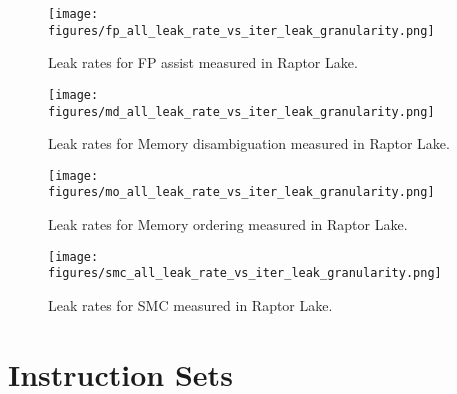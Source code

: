 \begin{figure}[h]
    \centering
    \texttt{[image: figures/fp\_all\_leak\_rate\_vs\_iter\_leak\_granularity.png]}
    \caption{Leak rates for FP assist measured in Raptor Lake.}
    \label{fig:11}
\end{figure}


\begin{figure}[h]
    \centering
    \texttt{[image: figures/md\_all\_leak\_rate\_vs\_iter\_leak\_granularity.png]}
    \caption{Leak rates for Memory disambiguation measured in Raptor Lake.}
    \label{fig:12}
\end{figure}


\begin{figure}[h]
    \centering
    \texttt{[image: figures/mo\_all\_leak\_rate\_vs\_iter\_leak\_granularity.png]}
    \caption{Leak rates for Memory ordering measured in Raptor Lake.}
    \label{fig:13}
\end{figure}


\begin{figure}[h]
    \centering
    \texttt{[image: figures/smc\_all\_leak\_rate\_vs\_iter\_leak\_granularity.png]}
    \caption{Leak rates for SMC measured in Raptor Lake.}
    \label{fig:14}
\end{figure}






\section{Instruction Sets}


